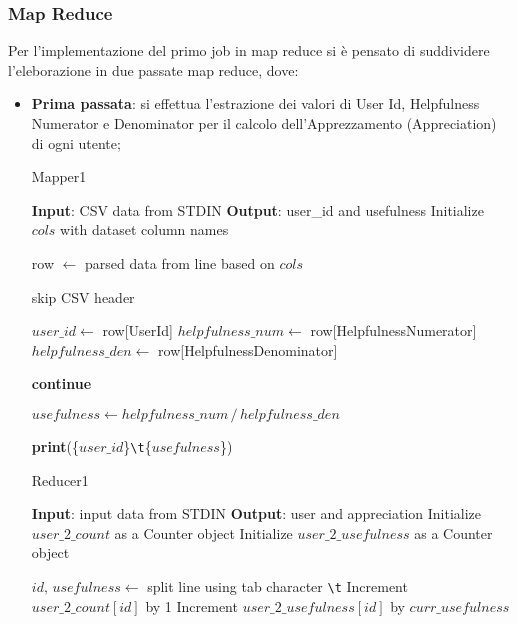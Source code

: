   \subsubsection{Map Reduce}
    Per l'implementazione del primo job in map reduce si è pensato di suddividere l'eleborazione in due passate map reduce, dove:
  \begin{itemize}
    \item \textbf{Prima passata}: si effettua l'estrazione dei valori di User Id, Helpfulness Numerator e Denominator per il calcolo dell'Apprezzamento (Appreciation) di ogni utente;
    \begin{algorithm}[!ht]
    \caption{Mapper1}
      \begin{algorithmic}[1]
        \STATE \textbf{Input}: CSV data from STDIN
        \STATE \textbf{Output}: user\_id and usefulness
        \STATE Initialize $cols$ with dataset column names
  
        \STATE row $\gets$ parsed data from line based on $cols$
        
        \STATE skip CSV header
    
        \STATE $user\_id \gets$ row[UserId]
        \STATE $helpfulness\_num \gets$ row[HelpfulnessNumerator]
        \STATE $helpfulness\_den \gets$ row[HelpfulnessDenominator]
        
         \STATE \textbf{continue}
        \ENDIF
      
        \STATE $usefulness \gets helpfulness\_num \,/\, helpfulness\_den$
        
        \STATE \textbf{print}(\{$user\_id$\}\texttt{\textbackslash t}\{$usefulness$\})
       \ENDFOR
      \end{algorithmic}
    \end{algorithm}
    \begin{algorithm}[!ht]
      \caption{Reducer1}
      \begin{algorithmic}[1]
        \STATE \textbf{Input}: input data from STDIN
        \STATE \textbf{Output}: user and appreciation
        \STATE Initialize $user\_2\_count$ as a Counter object
        \STATE Initialize $user\_2\_usefulness$ as a Counter object
        
          \STATE $id,\, usefulness \gets$ split line using tab character \texttt{\textbackslash t}
            \STATE Increment $user\_2\_count[id]$ by 1
            \STATE Increment $user\_2\_usefulness[id]$ by $curr\_usefulness$
        \ENDFOR
        

\end{algorithmic}
\end{algorithm}
\end{itemize}

